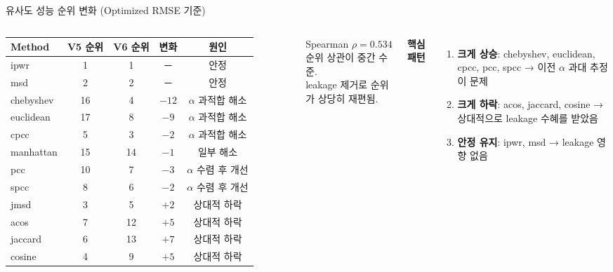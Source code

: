 \documentclass[aspectratio=169,10pt]{beamer}
\begin{document}
\begin{frame}[shrink=5]{유사도 성능 순위 변화 (Optimized RMSE 기준)}
	\begin{columns}[T]
			\renewcommand{\arraystretch}{1.2}
			\begin{tabular}{l|c|c|c|c}
				\toprule
				\textbf{Method} & \textbf{V5 순위} & \textbf{V6 순위} & \textbf{변화} & \textbf{원인} \\
				\midrule
				ipwr          &  1 &  1 & ─      & 안정 \\
				msd           &  2 &  2 & ─      & 안정 \\
				chebyshev     & 16 &  4 & \textcolor{testgreen}{$-12$} & $\alpha$ 과적합 해소 \\
				euclidean     & 17 &  8 & \textcolor{testgreen}{$-9$}  & $\alpha$ 과적합 해소 \\
				cpcc          &  5 &  3 & \textcolor{testgreen}{$-2$}  & $\alpha$ 과적합 해소 \\
				manhattan     & 15 & 14 & \textcolor{testgreen}{$-1$}  & 일부 해소 \\
				pcc           & 10 &  7 & \textcolor{testgreen}{$-3$}  & $\alpha$ 수렴 후 개선 \\
				spcc          &  8 &  6 & \textcolor{testgreen}{$-2$}  & $\alpha$ 수렴 후 개선 \\
				jmsd          &  3 &  5 & \textcolor{negred}{$+2$}   & 상대적 하락 \\
				acos          &  7 & 12 & \textcolor{negred}{$+5$}   & 상대적 하락 \\
				jaccard       &  6 & 13 & \textcolor{negred}{$+7$}   & 상대적 하락 \\
				cosine        &  4 &  9 & \textcolor{negred}{$+5$}   & 상대적 하락 \\
				\bottomrule
			\end{tabular}

			\begin{alertblock}{Spearman $\rho = 0.534$}
				순위 상관이 중간 수준.\\
				leakage 제거로 순위가 상당히 재편됨.
			\end{alertblock}

			\vspace{0.5em}
			\textbf{핵심 패턴}
			\begin{enumerate}
				\item \textbf{크게 상승}: chebyshev, euclidean, cpcc, pcc, spcc
					→ 이전 $\alpha$ 과대 추정이 문제
				\item \textbf{크게 하락}: acos, jaccard, cosine
					→ 상대적으로 leakage 수혜를 받았음
				\item \textbf{안정 유지}: ipwr, msd
					→ leakage 영향 없음
			\end{enumerate}
	\end{columns}
\end{frame}
\end{document}
